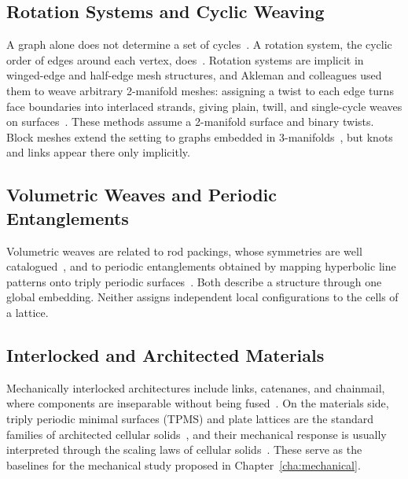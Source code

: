 \subsection{Rotation Systems and Cyclic Weaving}
A graph alone does not determine a set of cycles~\cite{tait1877knots}. A rotation system, the cyclic order of edges around each vertex, does~\cite{edmonds1960combinatorial,gross2001topological}. Rotation systems are implicit in winged-edge and half-edge mesh structures, and Akleman and colleagues used them to weave arbitrary 2-manifold meshes: assigning a twist to each edge turns face boundaries into interlaced strands, giving plain, twill, and single-cycle weaves on surfaces~\cite{akleman2009cyclic,xing2010single,akleman2011cyclic,akleman2015extended,akleman2020topologically}. These methods assume a 2-manifold surface and binary twists. Block meshes extend the setting to graphs embedded in 3-manifolds~\cite{akleman2015blockmeshes}, but knots and links appear there only implicitly.

\subsection{Volumetric Weaves and Periodic Entanglements}
Volumetric weaves are related to rod packings, whose symmetries are well catalogued~\cite{okeeffe2001invariant_cubic_rod_packing,rosi2005rodpacking}, and to periodic entanglements obtained by mapping hyperbolic line patterns onto triply periodic surfaces~\cite{evans2013periodiceentanglement1,evans2013periodiceentanglement2}. Both describe a structure through one global embedding. Neither assigns independent local configurations to the cells of a lattice.

\subsection{Interlocked and Architected Materials}
Mechanically interlocked architectures include links, catenanes, and chainmail, where components are inseparable without being fused~\cite{carlucci2003polycatenation,tang2023chainmail,zhou20253d}. On the materials side, triply periodic minimal surfaces (TPMS) and plate lattices are the standard families of architected cellular solids~\cite{schoen1970infinite,alketan2019tpms,berger2017plate}, and their mechanical response is usually interpreted through the scaling laws of cellular solids~\cite{gibson1997cellular}. These serve as the baselines for the mechanical study proposed in Chapter~\ref{cha:mechanical}.

